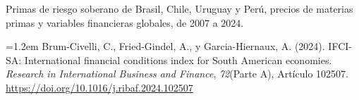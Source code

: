 \documentclass{article}
\newcommand{\smallsize}{\fontsize{22.1}{28.7}\selectfont}
\begin{document}
\vfill
\begin{tcolorbox}[enhanced, sharp corners, colback=navy, boxrule=0pt, width=\paperwidth,
  left=34mm, right=34mm, top=14mm, bottom=11mm,
  overlay={\fill[gold] (frame.north west) rectangle ([yshift=-5mm]frame.north east);}]
\begin{minipage}[c]{245mm}\raggedright
{\color{acento}\smallsize\bfseries{}}\par\vspace{5mm}
{\color{white}\smallsize Primas de riesgo soberano de Brasil, Chile, Uruguay y Perú, precios de materias primas y variables financieras globales, de 2007 a 2024.}
\end{minipage}\hfill
\begin{minipage}[c]{385mm}\raggedright
{\color{acento}\smallsize\bfseries{}}\par\vspace{5mm}
{\color{white}\smallsize\hangindent=1.2em Brum-Civelli, C., Fried-Gindel, A., y Garcia-Hiernaux, A. (2024). IFCI-SA: International financial conditions index for South American economies. \textit{Research in International Business and Finance}, \textit{72}(Parte A), Artículo 102507. \url{https://doi.org/10.1016/j.ribaf.2024.102507}\par}
\end{minipage}\hfill
\begin{minipage}[c]{100mm}\centering
{}\par\vspace{4mm}
{\color{acento}\fontsize{17}{21}\selectfont\bfseries{}}
\end{minipage}
\end{tcolorbox}
\end{document}
